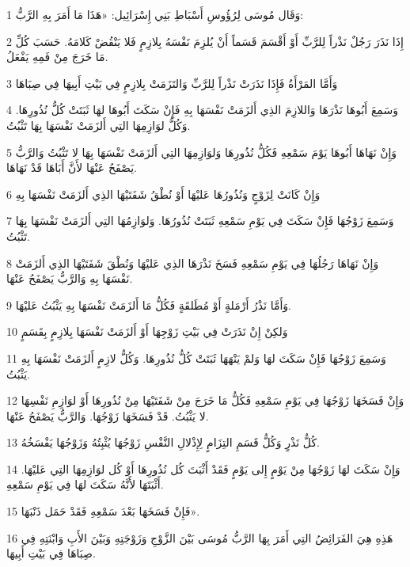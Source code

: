 \par 1 وَقَال مُوسَى لِرُؤُوسِ أَسْبَاطِ بَنِي إِسْرَائِيل: «هَذَا مَا أَمَرَ بِهِ الرَّبُّ:
\par 2 إِذَا نَذَرَ رَجُلٌ نَذْراً لِلرَّبِّ أَوْ أَقْسَمَ قَسَماً أَنْ يُلزِمَ نَفْسَهُ بِلازِمٍ فَلا يَنْقُضْ كَلامَهُ. حَسَبَ كُلِّ مَا خَرَجَ مِنْ فَمِهِ يَفْعَلُ.
\par 3 وَأَمَّا المَرْأَةُ فَإِذَا نَذَرَتْ نَذْراً لِلرَّبِّ وَالتَزَمَتْ بِلازِمٍ فِي بَيْتِ أَبِيهَا فِي صِبَاهَا
\par 4 وَسَمِعَ أَبُوهَا نَذْرَهَا وَاللازِمَ الذِي أَلزَمَتْ نَفْسَهَا بِهِ فَإِنْ سَكَتَ أَبُوهَا لهَا ثَبَتَتْ كُلُّ نُذُورِهَا. وَكُلُّ لوَازِمِهَا التِي أَلزَمَتْ نَفْسَهَا بِهَا تَثْبُتُ.
\par 5 وَإِنْ نَهَاهَا أَبُوهَا يَوْمَ سَمْعِهِ فَكُلُّ نُذُورِهَا وَلوَازِمِهَا التِي أَلزَمَتْ نَفْسَهَا بِهَا لا تَثْبُتُ وَالرَّبُّ يَصْفَحُ عَنْهَا لأَنَّ أَبَاهَا قَدْ نَهَاهَا.
\par 6 وَإِنْ كَانَتْ لِزَوْجٍ وَنُذُورُهَا عَليْهَا أَوْ نُطْقُ شَفَتَيْهَا الذِي أَلزَمَتْ نَفْسَهَا بِهِ
\par 7 وَسَمِعَ زَوْجُهَا فَإِنْ سَكَتَ فِي يَوْمِ سَمْعِهِ ثَبَتَتْ نُذُورُهَا. وَلوَازِمُهَا التِي أَلزَمَتْ نَفْسَهَا بِهَا تَثْبُتُ.
\par 8 وَإِنْ نَهَاهَا رَجُلُهَا فِي يَوْمِ سَمْعِهِ فَسَخَ نَذْرَهَا الذِي عَليْهَا وَنُطْقَ شَفَتَيْهَا الذِي أَلزَمَتْ نَفْسَهَا بِهِ وَالرَّبُّ يَصْفَحُ عَنْهَا.
\par 9 وَأَمَّا نَذْرُ أَرْمَلةٍ أَوْ مُطَلقَةٍ فَكُلُّ مَا أَلزَمَتْ نَفْسَهَا بِهِ يَثْبُتُ عَليْهَا.
\par 10 وَلكِنْ إِنْ نَذَرَتْ فِي بَيْتِ زَوْجِهَا أَوْ أَلزَمَتْ نَفْسَهَا بِلازِمٍ بِقَسَمٍ
\par 11 وَسَمِعَ زَوْجُهَا فَإِنْ سَكَتَ لهَا وَلمْ يَنْهَهَا ثَبَتَتْ كُلُّ نُذُورِهَا. وَكُلُّ لازِمٍ أَلزَمَتْ نَفْسَهَا بِهِ يَثْبُتُ.
\par 12 وَإِنْ فَسَخَهَا زَوْجُهَا فِي يَوْمِ سَمْعِهِ فَكُلُّ مَا خَرَجَ مِنْ شَفَتَيْهَا مِنْ نُذُورِهَا أَوْ لوَازِمِ نَفْسِهَا لا يَثْبُتُ. قَدْ فَسَخَهَا زَوْجُهَا. وَالرَّبُّ يَصْفَحُ عَنْهَا.
\par 13 كُلُّ نَذْرٍ وَكُلُّ قَسَمِ التِزَامٍ لِإِذْلالِ النَّفْسِ زَوْجُهَا يُثْبِتُهُ وَزَوْجُهَا يَفْسَخُهُ.
\par 14 وَإِنْ سَكَتَ لهَا زَوْجُهَا مِنْ يَوْمٍ إِلى يَوْمٍ فَقَدْ أَثْبَتَ كُل نُذُورِهَا أَوْ كُل لوَازِمِهَا التِي عَليْهَا. أَثْبَتَهَا لأَنَّهُ سَكَتَ لهَا فِي يَوْمِ سَمْعِهِ.
\par 15 فَإِنْ فَسَخَهَا بَعْدَ سَمْعِهِ فَقَدْ حَمَل ذَنْبَهَا».
\par 16 هَذِهِ هِيَ الفَرَائِضُ التِي أَمَرَ بِهَا الرَّبُّ مُوسَى بَيْنَ الزَّوْجِ وَزَوْجَتِهِ وَبَيْنَ الأَبِ وَابْنَتِهِ فِي صِبَاهَا فِي بَيْتِ أَبِيهَا.

